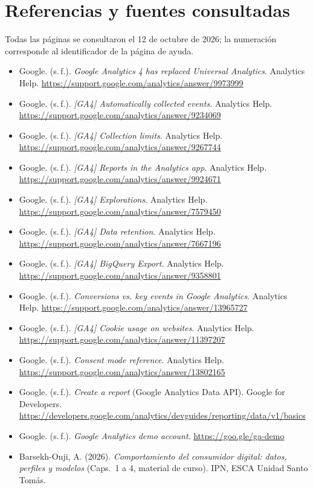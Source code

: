\documentclass[11pt,letterpaper]{article}
\begin{document}
\section{Referencias y fuentes consultadas}

Todas las páginas se consultaron el 12 de octubre de 2026; la numeración corresponde al identificador de la página de ayuda.

\begin{itemize}[nosep,leftmargin=*]\small
  \item Google. (s.\,f.). \emph{Google Analytics 4 has replaced Universal Analytics}. Analytics Help. \url{https://support.google.com/analytics/answer/9973999}
  \item Google. (s.\,f.). \emph{[GA4] Automatically collected events}. Analytics Help. \url{https://support.google.com/analytics/answer/9234069}
  \item Google. (s.\,f.). \emph{[GA4] Collection limits}. Analytics Help. \url{https://support.google.com/analytics/answer/9267744}
  \item Google. (s.\,f.). \emph{[GA4] Reports in the Analytics app}. Analytics Help. \url{https://support.google.com/analytics/answer/9924671}
  \item Google. (s.\,f.). \emph{[GA4] Explorations}. Analytics Help. \url{https://support.google.com/analytics/answer/7579450}
  \item Google. (s.\,f.). \emph{[GA4] Data retention}. Analytics Help. \url{https://support.google.com/analytics/answer/7667196}
  \item Google. (s.\,f.). \emph{[GA4] BigQuery Export}. Analytics Help. \url{https://support.google.com/analytics/answer/9358801}
  \item Google. (s.\,f.). \emph{Conversions vs. key events in Google Analytics}. Analytics Help. \url{https://support.google.com/analytics/answer/13965727}
  \item Google. (s.\,f.). \emph{[GA4] Cookie usage on websites}. Analytics Help. \url{https://support.google.com/analytics/answer/11397207}
  \item Google. (s.\,f.). \emph{Consent mode reference}. Analytics Help. \url{https://support.google.com/analytics/answer/13802165}
  \item Google. (s.\,f.). \emph{Create a report} (Google Analytics Data API). Google for Developers. \url{https://developers.google.com/analytics/devguides/reporting/data/v1/basics}
  \item Google. (s.\,f.). \emph{Google Analytics demo account}. \url{https://goo.gle/ga-demo}
  \item Barsekh-Onji, A. (2026). \emph{Comportamiento del consumidor digital: datos, perfiles y modelos} (Caps.~1 a 4, material de curso). IPN, ESCA Unidad Santo Tomás.
\end{itemize}
\end{document}
